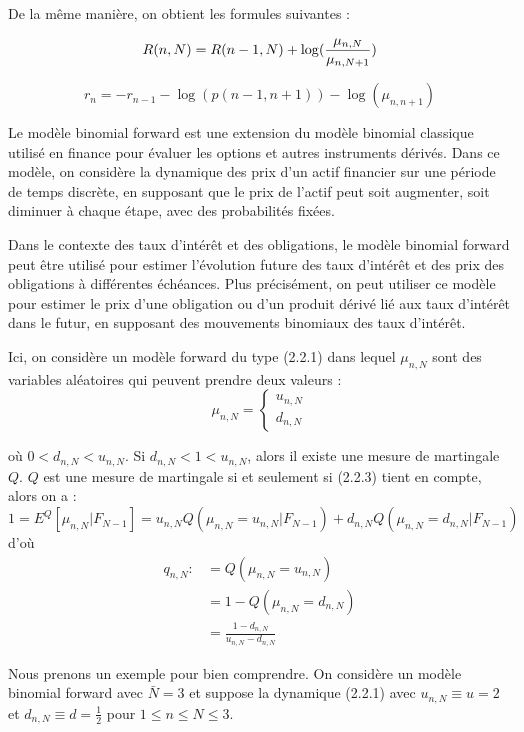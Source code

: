 De la même manière, on obtient les formules suivantes : 

$$R(n,N)=R(n-1,N) + \log({\mu_{n,N} \over \mu_{n,N+1}})$$

$$r_n=-r_{n-1}-\log(p(n-1,n+1))-\log(\mu_{n,n+1})$$

Le modèle binomial forward est une extension du modèle binomial classique utilisé en finance pour évaluer les options et autres instruments dérivés. Dans ce modèle, on considère la dynamique des prix d'un actif financier sur une période de temps discrète, en supposant que le prix de l'actif peut soit augmenter, soit diminuer à chaque étape, avec des probabilités fixées.

Dans le contexte des taux d'intérêt et des obligations, le modèle binomial forward peut être utilisé pour estimer l'évolution future des taux d'intérêt et des prix des obligations à différentes échéances. Plus précisément, on peut utiliser ce modèle pour estimer le prix d'une obligation ou d'un produit dérivé lié aux taux d'intérêt dans le futur, en supposant des mouvements binomiaux des taux d'intérêt.

Ici, on considère un modèle forward du type (2.2.1) dans lequel \(\mu_{n,N}\) sont des variables aléatoires qui peuvent prendre deux valeurs :
\begin{equation}
\mu_{n,N} =
\begin{cases}
u_{n,N} \\
d_{n,N}
\end{cases} 
\end{equation}

où \(0 < d_{n,N} < u_{n,N}\). Si \(d_{n,N} < 1 < u_{n,N}\), alors il existe une mesure de martingale \(Q\). \(Q\) est une mesure de martingale si et seulement si (2.2.3) tient en compte, alors on a :
$$
1=E^Q[\mu_{n,N}|F_{N-1}]=u_{n,N}Q(\mu_{n,N}=u_{n,N}|F_{N-1})+d_{n,N}Q(\mu_{n,N}=d_{n,N}|F_{N-1})
$$
d'où
    \begin{align*}    
    q_{n,N} :&= Q(\mu_{n,N} = u_{n,N})\\
    &= 1 - Q(\mu_{n,N} = d_{n,N}) \\
    &= \frac{1 - d_{n,N}}{u_{n,N} - d_{n,N}} 
    \end{align*}

Nous prenons un exemple pour bien comprendre. On considère un modèle binomial forward avec \(\bar{N} = 3\) et suppose la dynamique (2.2.1) avec \(u_{n,N} \equiv u = 2\) et \(d_{n,N} \equiv d = \frac{1}{2}\) pour \(1 \leq n \leq N \leq 3\).

